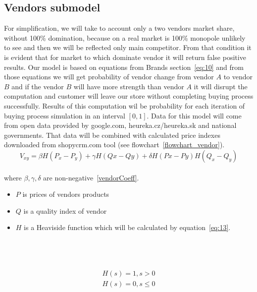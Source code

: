 \subsection{Vendors submodel} \label{subsec:model_vendors}
For simplification, we will take to account only a two vendors market share, without 100\% domination, because on a real
market is 100\% monopole unlikely to see and then we will be reflected only main competitor.
From that condition it is evident that for market to which dominate vendor it will return false positive results.
Our model is based on equations from Brands section~\ref{eq:10} and from those equations we will get probability of vendor
change from vendor $A$ to vendor $B$ and if the vendor $B$ will have more strength than vendor $A$ it will disrupt the
computation and customer will leave our store without completing buying process successfully.
Results of this computation wil be probability for each iteration of buying process simulation in an interval $[0,1]$.
Data for this model will come from open data provided by google.com, heureka.cz/heureka.sk and national governments.
That data will be combined with calculated price indexes downloaded from shopycrm.com tool (see flowchart~\ref{flowchart_vendor}).
\\
\begin{equation} \label{eq:13}
V_{xy} = \beta H(P_x-P_y) + \gamma H(Qx-Qy) + \delta H(Px-Py)H(Q_x - Q_y)
\end{equation}
\\
where $\beta, \gamma, \delta$ are non-negative~\ref{vendorCoeff}.
\\
\begin{itemize}
    \item $P$ is prices of vendors products
    \item $Q$ is a quality index of vendor
    \item $H$ is a Heaviside function which will be calculated by equation~\ref{eq:13}.
\end{itemize}\\
\\
\\
\begin{equation} \label{eq:14}
\begin{array}{l}
    H(s) = 1, s > 0 \\
    H (s) = 0, s \leq 0
\end{array}
\end{equation}
\\
